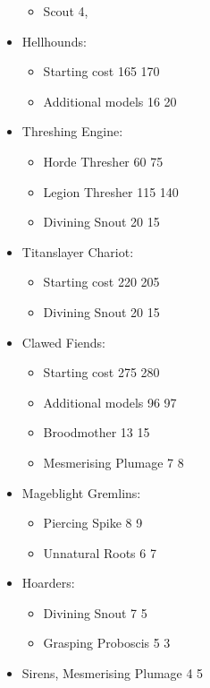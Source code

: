 \begin{itemize}
\begin{itemize}
\item Scout 4\permodel{}, 
\end{itemize}
\item Hellhounds:
\begin{itemize}
\item Starting cost 165 \costup{} 170
\item Additional models 16\permodel{} \costup{} 20\permodel{}
\end{itemize}
\item Threshing Engine:
\begin{itemize}
\item Horde Thresher 60 \costup{} 75
\item Legion Thresher 115 \costup{} 140
\item Divining Snout 20 \costdown{} 15
\end{itemize}
\item Titanslayer Chariot:
\begin{itemize}
\item Starting cost 220 \costdown{} 205
\item Divining Snout 20 \costdown{} 15
\end{itemize}
\item Clawed Fiends:
\begin{itemize}
\item Starting cost 275 \costup{} 280
\item Additional models 96\permodel{} \costup{} 97\permodel{}
\item Broodmother 13\permodel{} \costup{} 15\permodel{}
\item Mesmerising Plumage 7\permodel{} \costdown{} 8\permodel{}
\end{itemize}
\item Mageblight Gremlins:
\begin{itemize}
\item Piercing Spike 8\permodel{} \costup{} 9\permodel{}
\item Unnatural Roots 6\permodel{} \costup{} 7\permodel{}
\end{itemize}
\item Hoarders:
\begin{itemize}
\item Divining Snout 7\permodel{} \costdown{} 5\permodel{}
\item Grasping Proboscis 5\permodel{} \costdown{} 3\permodel{}
\end{itemize}
\item Sirens, Mesmerising Plumage 4 \costup{} 5

\end{itemize}
